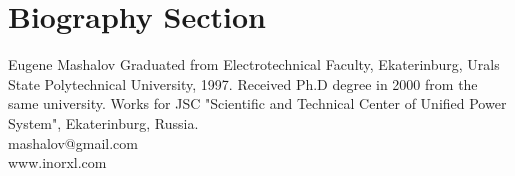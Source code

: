 \documentclass[lettersize,journal]{IEEEtran}
\begin{document}
\section{Biography Section}
\vspace{-33pt}
\begin{IEEEbiography}{Eugene Mashalov}
Graduated from Electrotechnical Faculty, Ekaterinburg, Urals State Polytechnical University, 1997. 
Received Ph.D degree in 2000 from the same university. 
Works for JSC "Scientific and Technical Center of Unified Power System", Ekaterinburg, Russia.\\
mashalov@gmail.com \\
www.inorxl.com
\end{IEEEbiography}
\vfill
\end{document}
